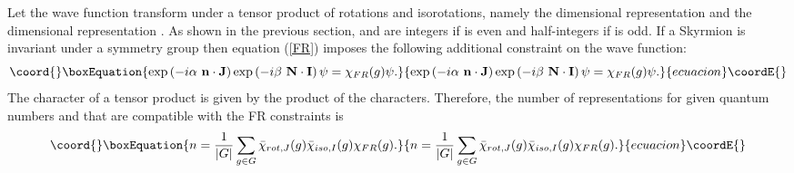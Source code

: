 \documentclass[a4paper,12pt]{article}
\begin{document}
Let the wave function \myHighlight{$\psi$}\coordHE{} transform under a tensor 
product of rotations and isorotations, namely
the \coordHE{} dimensional representation \coordHE{} 
and the \coordHE{} dimensional representation \coordHE{}. As shown in the 
previous section, \coordHE{} and \coordHE{} are integers if \coordHE{} is even and 
half-integers if \coordHE{} is odd. If a Skyrmion is invariant under a symmetry 
group then equation (\ref{FR}) imposes the following additional 
constraint on the wave function:
%
\begin{equation}\coord{}\boxEquation{
\exp\left( -i \alpha\ {\bf n} \cdot {\bf J} \right)
\exp\left( -i \beta\ {\bf N} \cdot {\bf I} \right)
\psi = \chi_{FR}(g) \psi.
}{
\exp\left( -i \alpha\ {\bf n} \cdot {\bf J} \right)
\exp\left( -i \beta\ {\bf N} \cdot {\bf I} \right)
\psi = \chi_{FR}(g) \psi.
}{ecuacion}\coordE{}\end{equation}
%
The character of a tensor product is given by the product of the 
characters. Therefore, the number \coordHE{} of representations for given quantum 
numbers \coordHE{} and \coordHE{} that are compatible with the FR constraints is 
%
\begin{equation}\coord{}\boxEquation{
\label{chiFR}
n = \frac{1}{|G|} \sum \limits_{g \in G} 
{\bar \chi}_{rot,J}(g) {\bar \chi}_{iso,I}(g) \chi_{FR}(g).
}{
n = \frac{1}{|G|} \sum \limits_{g \in G} 
{\bar \chi}_{rot,J}(g) {\bar \chi}_{iso,I}(g) \chi_{FR}(g).
}{ecuacion}\coordE{}\end{equation}
\end{document}
